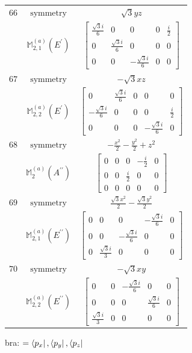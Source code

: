 \documentclass[fleqn,8pt,landscape]{jsarticle}
\begin{document}
\begin{longtable}{ccc}
$ 66 $ & $ \text{symmetry} $ & $ \sqrt{3} y z $ \\
$  $ & $ \mathbb{M}_{2,1}^{(a)}(E^{\prime}) $ & $ \begin{bmatrix} \frac{\sqrt{3} i}{6} & 0 & 0 & 0 & \frac{i}{2} \\ 0 & \frac{\sqrt{3} i}{6} & 0 & 0 & 0 \\ 0 & 0 & - \frac{\sqrt{3} i}{6} & 0 & 0 \end{bmatrix} $ \\ \hline
$ 67 $ & $ \text{symmetry} $ & $ - \sqrt{3} x z $ \\
$  $ & $ \mathbb{M}_{2,2}^{(a)}(E^{\prime}) $ & $ \begin{bmatrix} 0 & \frac{\sqrt{3} i}{6} & 0 & 0 & 0 \\ - \frac{\sqrt{3} i}{6} & 0 & 0 & 0 & \frac{i}{2} \\ 0 & 0 & 0 & - \frac{\sqrt{3} i}{6} & 0 \end{bmatrix} $ \\ \hline
$ 68 $ & $ \text{symmetry} $ & $ - \frac{x^{2}}{2} - \frac{y^{2}}{2} + z^{2} $ \\
$  $ & $ \mathbb{M}_{2}^{(a)}(A^{\prime\prime}) $ & $ \begin{bmatrix} 0 & 0 & 0 & - \frac{i}{2} & 0 \\ 0 & 0 & \frac{i}{2} & 0 & 0 \\ 0 & 0 & 0 & 0 & 0 \end{bmatrix} $ \\ \hline
$ 69 $ & $ \text{symmetry} $ & $ \frac{\sqrt{3} x^{2}}{2} - \frac{\sqrt{3} y^{2}}{2} $ \\
$  $ & $ \mathbb{M}_{2,1}^{(a)}(E^{\prime\prime}) $ & $ \begin{bmatrix} 0 & 0 & 0 & - \frac{\sqrt{3} i}{6} & 0 \\ 0 & 0 & - \frac{\sqrt{3} i}{6} & 0 & 0 \\ 0 & \frac{\sqrt{3} i}{3} & 0 & 0 & 0 \end{bmatrix} $ \\ \hline
$ 70 $ & $ \text{symmetry} $ & $ - \sqrt{3} x y $ \\
$  $ & $ \mathbb{M}_{2,2}^{(a)}(E^{\prime\prime}) $ & $ \begin{bmatrix} 0 & 0 & - \frac{\sqrt{3} i}{6} & 0 & 0 \\ 0 & 0 & 0 & \frac{\sqrt{3} i}{6} & 0 \\ \frac{\sqrt{3} i}{3} & 0 & 0 & 0 & 0 \end{bmatrix} $ \\ \hline
\end{longtable}
bra: $=\bra{p_{x}}, \bra{p_{y}}, \bra{p_{z}}$
\end{document}
